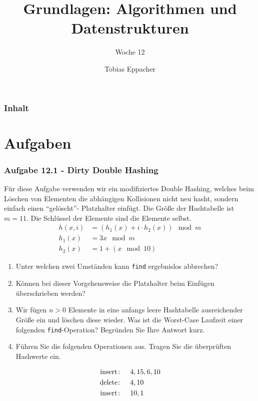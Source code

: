 \documentclass{beamer}
\title{Grundlagen: Algorithmen und Datenstrukturen}
\author{Tobias Eppacher}
\date{\presdatum}
\institute{School of Computation, Information and Technology}
\subtitle{Woche 12}
\begin{document}
\begin{frame}
	\titlepage
\end{frame}

\begin{frame}
	\frametitle{Inhalt}
	\tableofcontents[subsectionstyle=hide]
\end{frame}

\section{Aufgaben}

\begin{frame}
	\frametitle{Aufgabe 12.1 - Dirty Double Hashing}
	\scriptsize
	Für diese Aufgabe verwenden wir ein modifiziertes Double Hashing, welches beim Löschen
	von Elementen die abhängigen Kollisionen nicht neu hasht, sondern einfach einen “gelöscht”-
	Platzhalter einfügt.
	Die Größe der Hashtabelle ist $m = 11$. Die Schlüssel der Elemente sind die Elemente selbst.
	\begin{align*}
		h(x, i) & = (h_1(x) + i \cdot h_2(x)) \mod m \\
		h_1(x)  & = 3x \mod m                        \\
		h_2(x)  & = 1 + (x \mod 10)
	\end{align*}

	\begin{enumerate}[label=\textcolor{black}{\alph*)},align=left,leftmargin=*]
		\item Unter welchen zwei Umständen kann \lstinline{find} ergebnislos abbrechen?
		\item Können bei dieser Vorgehensweise die Platzhalter beim Einfügen überschrieben werden?
		\item Wir fügen $n > 0$ Elemente in eine anfangs leere Hashtabelle ausreichender Größe
		      ein und löschen diese wieder. Was ist die Worst-Case Laufzeit einer folgenden \lstinline{find}-Operation? Begründen Sie Ihre Antwort kurz.
		\item Führen Sie die folgenden Operationen aus. Tragen Sie die überprüften Hashwerte ein.
	\end{enumerate}
	\begin{align*}
		\text{\lstinline{insert}: } & \quad 4, 15, 6, 10 \\
		\text{\lstinline{delete}: } & \quad 4, 10        \\
		\text{\lstinline{insert}: } & \quad 10, 1
	\end{align*}

\end{frame}
\end{document}
